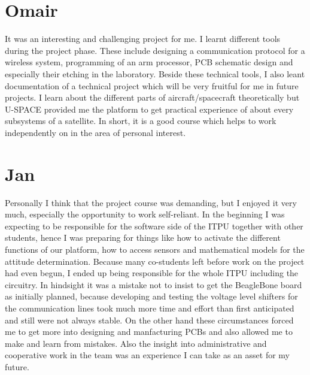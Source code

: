 \section{Omair}
It was an interesting and challenging project for me. I learnt different tools during the project phase. These include designing a communication protocol for a wireless system, programming of an arm processor, \ac{PCB} schematic design and especially their etching in the laboratory. Beside these technical tools, I also leant documentation of a technical project which will be very fruitful for me in future projects. I learn about the different parts of aircraft/spacecraft theoretically but \ac{U-SPACE} provided me the platform to get practical experience of about every subsystems of a satellite. In short, it is a good course which helps to work independently on in the area of personal interest. 
%
\section{Jan}

Personally I think that the project course was demanding, but I enjoyed it very much, especially the opportunity to work self-reliant. In the beginning I was expecting to be responsible for the software side of the ITPU together with other students, hence I was preparing for things like how to activate the different functions of our platform, how to access sensors and mathematical models for the attitude determination. Because many co-students left before work on the project had even begun, I ended up being responsible for the whole ITPU including the circuitry. In hindsight it was a mistake not to insist to get the BeagleBone board as initially planned, because developing and testing the voltage level shifters for the communication lines took much more time and effort than first anticipated and still were not always stable. 
On the other hand these circumstances forced me to get more into designing and manfacturing PCBs and also allowed me to make and learn from mistakes. Also the insight into administrative and cooperative work in the team was an experience I can take as an asset for my future.

